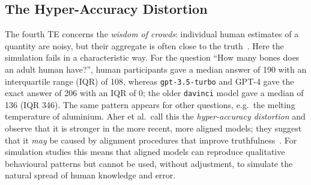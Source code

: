 \subsection{The Hyper-Accuracy Distortion}
The fourth TE concerns the \emph{wisdom of crowds}: individual human estimates of a quantity are noisy, but their aggregate is often close to the truth~\cite{surowiecki2004wisdom}. Here the simulation fails in a characteristic way. For the question ``How many bones does an adult human have?'', human participants gave a median answer of 190 with an interquartile range (IQR) of 108, whereas \texttt{gpt-3.5-turbo} and GPT-4 gave the exact answer of 206 with an IQR of 0; the older \texttt{davinci} model gave a median of 136 (IQR 346). %
The same pattern appears for other questions, e.g.\ the melting temperature of aluminium. Aher et al.\ call this the \emph{hyper-accuracy distortion} and observe that it is stronger in the more recent, more aligned models; they suggest that it \emph{may} be caused by alignment procedures that improve truthfulness~\cite{aher2023using, ouyang2022training}. %
For simulation studies this means that aligned models can reproduce qualitative behavioural patterns but cannot be used, without adjustment, to simulate the natural spread of human knowledge and error.
